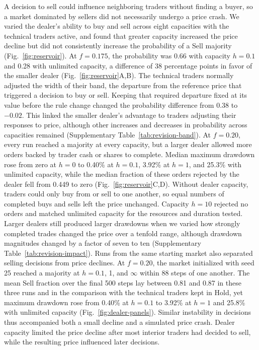 A decision to sell could influence neighboring traders without finding a
buyer, so a market dominated by sellers did not necessarily undergo a price
crash. We varied the dealer's ability to buy and sell across eight
capacities with the technical traders active, and found
that greater capacity increased the price decline but did not consistently
increase the probability of a Sell majority (Fig.~\ref{fig:reservoir}). At
$f=0.175$, the probability was 0.66 with capacity $h=0.1$ and 0.28 with
unlimited capacity, a difference of 38 percentage points in favor of the
smaller dealer (Fig.~\ref{fig:reservoir}A,B). The technical traders normally
adjusted the width of their band, the departure from the reference price
that triggered a decision to buy or sell. Keeping that required departure fixed at its value
before the rule change changed the probability difference from 0.38 to
$-0.02$. This linked the smaller dealer's advantage to traders adjusting
their responses to price, although other increases and decreases in
probability across capacities remained (Supplementary
Table~\ref{tab:revision-band}). At $f=0.20$, every run reached a majority at
every capacity, but a larger dealer allowed more orders backed by trader
cash or shares to complete. Median maximum drawdown rose from zero at $h=0$
to 0.40\% at $h=0.1$, 3.92\% at $h=1$, and 25.3\% with unlimited capacity,
while the median fraction of these orders rejected by the dealer fell from
0.449 to zero (Fig.~\ref{fig:reservoir}C,D). Without dealer capacity,
traders could only buy from or sell to one another, so equal numbers of
completed buys and sells left the price unchanged. Capacity $h=10$ rejected
no orders and matched unlimited capacity for the resources and duration
tested. Larger dealers still produced larger drawdowns when we varied how
strongly completed trades changed the price over a tenfold range, although
drawdown magnitudes changed by a factor of seven to ten (Supplementary
Table~\ref{tab:revision-impact}). Runs from the same starting market also
separated selling decisions from price declines. At $f=0.20$, the market
initialized with seed 25 reached a majority at $h=0.1$, 1, and $\infty$
within 88 steps of one another. The mean Sell fraction over the final 500
steps lay between 0.81 and 0.87 in these three runs and in the comparison
with the technical traders kept in Hold, yet maximum drawdown rose from 0.40\% at
$h=0.1$ to 3.92\% at $h=1$ and 25.8\% with unlimited capacity
(Fig.~\ref{fig:dealer-panels}). Similar instability in decisions thus
accompanied both a small decline and a simulated price crash. Dealer
capacity limited the price decline after most interior traders had decided
to sell, while the resulting price influenced later decisions.

